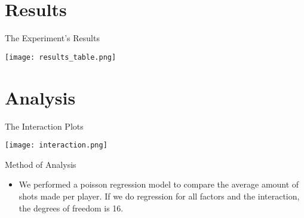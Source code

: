 \documentclass[ignorenonframetext,]{beamer}
\providecommand{\tightlist}{%
\setlength{\itemsep}{0pt}\setlength{\parskip}{0pt}}
\begin{document}
\section{Results}\label{results}

\begin{frame}{The Experiment's Results}

\begin{center}
\texttt{[image: results\_table.png]}
\end{center}

\end{frame}

\section{Analysis}\label{analysis}




\begin{frame}{The Interaction Plots}

\begin{center}
\texttt{[image: interaction.png]}
\end{center}

\end{frame}

\begin{frame}{Method of Analysis}

\begin{itemize}
\tightlist
\item
  We performed a poisson regression model to compare the average amount
  of shots made per player. If we do regression for all factors and the interaction, the degrees of freedom is 16.
\end{itemize}

\end{frame}
\end{document}
